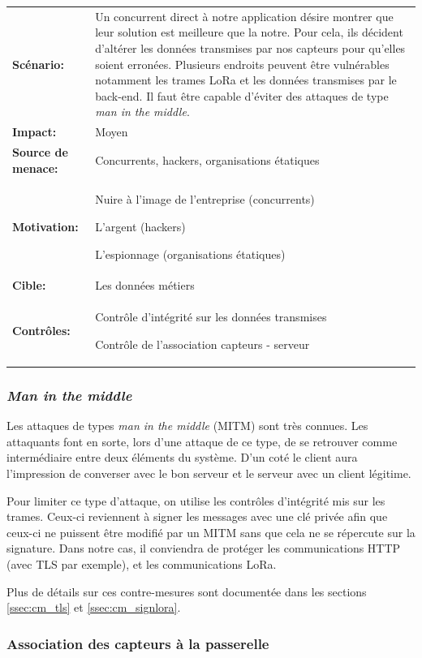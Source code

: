 \documentclass[12pt]{article}
\begin{document}
\renewcommand{\arraystretch}{1.6}
\begin{tabular}{@{}p{4cm}p{12cm}}
\textbf{Scénario:} &  Un concurrent direct à notre application désire montrer que leur solution est meilleure que la notre. Pour cela, ils décident d'altérer les données transmises par nos capteurs pour qu'elles soient erronées. Plusieurs endroits peuvent être vulnérables notamment les trames LoRa et les données transmises par le back-end. Il faut être capable d'éviter des attaques de type \emph{man in the middle}.  \\
\textbf{Impact:} & Moyen \\
\textbf{Source de menace: } & Concurrents, hackers, organisations étatiques \\
\textbf{Motivation:} & Nuire à l'image de l'entreprise (concurrents)

L'argent (hackers)

L'espionnage (organisations étatiques)\\
\textbf{Cible:} & Les données métiers\\
\textbf{Contrôles:} & Contrôle d'intégrité sur les données transmises

Contrôle de l'association capteurs - serveur
\end{tabular}
\renewcommand{\arraystretch}{1}

\subsubsection{\emph{Man in the middle}}

Les attaques de types \emph{man in the middle} (MITM) sont très connues. Les attaquants font en sorte, lors d'une attaque de ce type, de se retrouver comme intermédiaire entre deux éléments du système. D'un coté le client aura l'impression de converser avec le bon serveur et le serveur avec un client légitime. 

Pour limiter ce type d'attaque, on utilise les contrôles d'intégrité mis sur les trames. Ceux-ci reviennent à signer les messages avec une clé privée afin que ceux-ci ne puissent être modifié par un MITM sans que cela ne se répercute sur la signature. Dans notre cas, il conviendra de protéger les communications HTTP (avec TLS par exemple), et les communications LoRa. 

Plus de détails sur ces contre-mesures sont documentée dans les sections \ref{ssec:cm_tls} et \ref{ssec:cm_signlora}.

\subsubsection{Association des capteurs à la passerelle}
\end{document}
